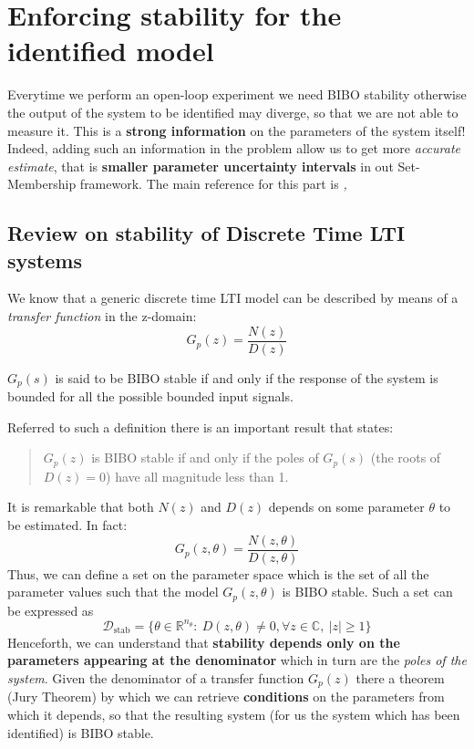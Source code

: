\chapter{Enforcing stability for the identified model}\label{chap:enforcing}

\textsf{Everytime we perform an open-loop experiment we need BIBO stability otherwise the output of the system to be identified may diverge, so that we are not able to measure it. This is a \textbf{strong information} on the parameters of the system itself! Indeed, adding such an information in the problem allow us to get more \textit{accurate estimate}, that is \textbf{smaller parameter uncertainty intervals} in out Set-Membership framework. The main reference for this part is \citeauthor{cerone2011enforcing} \textit{,  \cite{cerone2011enforcing}}}

\section{Review on stability of Discrete Time LTI systems}
We know that a generic discrete time LTI model can be described by means of a \textit{transfer function} in the z-domain:
\begin{equation}
    G_p(z)=\frac{N(z)}{D(z)}
\end{equation}
\begin{definition}
    $G_p(s)$ is said to be BIBO stable if and only if the response of the system is bounded for all the possible bounded input signals.
\end{definition}

\noindent
Referred to such a definition there is an important result that states: 
\begin{quotation}
    $G_p(z)$ is BIBO stable if and only if the poles of $G_p(s)$ (the roots of $D(z)=0$) have all magnitude less than 1.
 \end{quotation}
\noindent
 It is remarkable that both $N(z)$ and $D(z)$ depends on some parameter $\theta$ to be estimated. In fact:
 \begin{equation}
    G_p(z,\theta)=\frac{N(z,\theta)}{D(z,\theta)}
 \end{equation}
 Thus, we can define a set on the parameter space which is the set of all the parameter values such that the model $G_p(z,\theta)$ is BIBO stable. Such a set can be expressed as
 \begin{equation}
    \mathcal{D}_{\text{stab}}=\{
        \theta\in\mathbb{R}^{n_\theta} : \ D(z,\theta)\ne{0}, \forall{z}\in\mathbb{C}, \ \vert z \vert \ge 1
    \}
 \end{equation}
Henceforth, we can understand that \textbf{stability depends only on the parameters appearing at the denominator} which in turn are the \textit{poles of the system}. Given the denominator of a transfer function $G_p(z)$ there a  theorem (Jury Theorem) by which we can retrieve \textbf{conditions} on the parameters from which it depends, so that the resulting system (for us the system which has been identified) is BIBO stable. 


